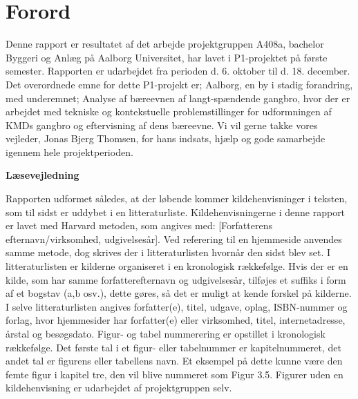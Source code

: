 \chapter*{Forord}

Denne rapport er resultatet af det arbejde projektgruppen A408a, bachelor Byggeri og Anlæg på Aalborg Universitet, har lavet i P1-projektet på første semester. Rapporten er udarbejdet fra perioden d. 6. oktober til d. 18. december. Det overordnede emne for dette P1-projekt er; Aalborg, en by i stadig forandring, med underemnet; Analyse af bæreevnen af langt-spændende gangbro, hvor der er arbejdet med tekniske og kontekstuelle problemstillinger for udformningen af KMDs gangbro og eftervisning af dens bæreevne. Vi vil gerne takke vores vejleder, Jonas Bjerg Thomsen, for hans indsats, hjælp og gode samarbejde igennem hele projektperioden.

\textbf{Læsevejledning}

Rapporten udformet således, at der løbende kommer kildehenvisninger i teksten, som til sidst er uddybet i en litteraturliste. Kildehenvisningerne i denne rapport er lavet med Harvard metoden, som angives med: [Forfatterens efternavn/virksomhed, udgivelsesår]. Ved referering til en hjemmeside anvendes samme metode, dog skrives der i litteraturlisten hvornår den sidst blev set. I litteraturlisten er kilderne organiseret i en kronologisk rækkefølge. Hvis der er en kilde, som har samme forfatterefternavn og udgivelsesår, tilføjes et suffiks i form af et bogstav (a,b osv.), dette gøres, så det er muligt at kende forskel på kilderne. I selve litteraturlisten angives forfatter(e), titel, udgave, oplag, ISBN-nummer og forlag, hvor hjemmesider har forfatter(e) eller virksomhed, titel, internetadresse, årstal og besøgsdato. Figur- og tabel nummerering er opstillet i kronologisk rækkefølge. Det første tal i et figur- eller tabelnummer er kapitelnummeret, det andet tal er figurens eller tabellens navn. Et eksempel på dette kunne være den femte figur i kapitel tre, den vil blive nummeret som Figur 3.5. Figurer uden en kildehenvisning er udarbejdet af projektgruppen selv.



\phantom{Luft}

\phantom{Luft}

